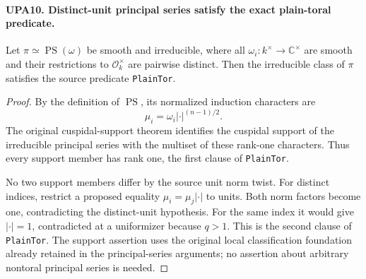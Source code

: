\documentclass[11pt,a4paper]{article}
\numberwithin{equation}{section}
\theoremstyle{remark}\newtheorem{remark}[theorem]{Remark}
\begin{document}
\paragraph{UPA10. Distinct-unit principal series satisfy the exact plain-toral predicate.}
\label{claim:UPA10}
Let $\pi\simeq\operatorname{PS}(\omega)$ be smooth and
irreducible, where all $\omega_i:k^\times\to\mathbb C^\times$
are smooth and their restrictions to $\mathcal O_k^\times$
are pairwise distinct.  Then the irreducible class of
$\pi$ satisfies the source predicate \texttt{Plain\allowbreak Tor}.
\begin{proof}
By the definition of $\operatorname{PS}$, its normalized
induction characters are
\[
              \mu_i=\omega_i|\cdot|^{(n-1)/2}.
 \tag{UPA.14}
\]
The original cuspidal-support theorem identifies the
cuspidal support of the irreducible principal series with
the multiset of these rank-one characters.  Thus every
support member has rank one, the first clause of
\texttt{Plain\allowbreak Tor}.

No two support members differ by the source unit norm
twist.  For distinct indices, restrict a proposed equality
$\mu_i=\mu_j|\cdot|$ to units.  Both norm factors become
one, contradicting the distinct-unit hypothesis.
For the same index it would give $|\cdot|=1$, contradicted
at a uniformizer because $q>1$.  This is the second
clause of \texttt{Plain\allowbreak Tor}.  The support assertion uses
the original local classification foundation already
retained in the principal-series arguments; no assertion
about arbitrary nontoral principal series is needed.
\end{proof}

\end{document}
